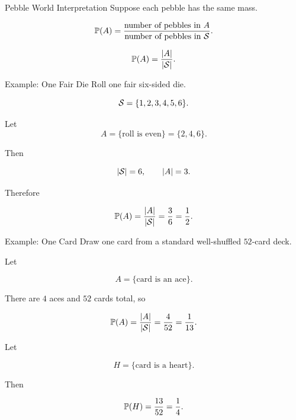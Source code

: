 \begin{frame}{Pebble World Interpretation}
Suppose each pebble has the same mass.

\[
\mathbb{P}(A)
=
\frac{\text{number of pebbles in } A}
{\text{number of pebbles in } \mathcal{S}}.
\]

\begin{center}
\end{center}

\[
\mathbb{P}(A) = \frac{|A|}{|\mathcal{S}|}.
\]
\end{frame}

\begin{frame}{Example: One Fair Die}
Roll one fair six-sided die.

\[
\mathcal{S} = \{1,2,3,4,5,6\}.
\]

Let
\[
A = \{\text{roll is even}\} = \{2,4,6\}.
\]

Then

\[
|\mathcal{S}| = 6,
\qquad
|A| = 3.
\]

Therefore

\[
\mathbb{P}(A)
=
\frac{|A|}{|\mathcal{S}|}
=
\frac{3}{6}
=
\frac{1}{2}.
\]
\end{frame}

\begin{frame}{Example: One Card}
Draw one card from a standard well-shuffled $52$-card deck.

Let

\[
A = \{\text{card is an ace}\}.
\]

There are $4$ aces and $52$ cards total, so

\[
\mathbb{P}(A)
=
\frac{|A|}{|\mathcal{S}|}
=
\frac{4}{52}
=
\frac{1}{13}.
\]

\vspace{0.25cm}

Let

\[
H = \{\text{card is a heart}\}.
\]

Then

\[
\mathbb{P}(H)
=
\frac{13}{52}
=
\frac{1}{4}.
\]
\end{frame}

